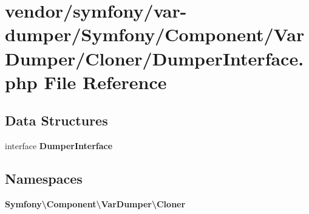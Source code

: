 \section{vendor/symfony/var-\/dumper/\+Symfony/\+Component/\+Var\+Dumper/\+Cloner/\+Dumper\+Interface.php File Reference}
\label{var-dumper_2_symfony_2_component_2_var_dumper_2_cloner_2_dumper_interface_8php}
\subsection*{Data Structures}
\begin{DoxyCompactItemize}
\item 
interface {\bf Dumper\+Interface}
\end{DoxyCompactItemize}
\subsection*{Namespaces}
\begin{DoxyCompactItemize}
\item 
 {\bf Symfony\textbackslash{}\+Component\textbackslash{}\+Var\+Dumper\textbackslash{}\+Cloner}
\end{DoxyCompactItemize}
